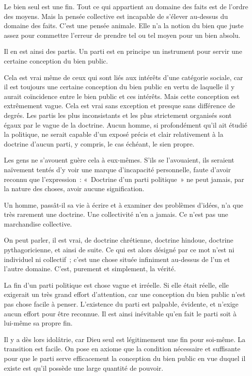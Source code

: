 \documentclass[french,twoside]{book} %
\begin{document}
Le bien seul est une fin. Tout ce qui appartient au domaine des faits est de l’ordre des moyens. Mais la pensée collective est incapable de s’élever au-dessus du domaine des faits. C’est une pensée animale. Elle n’a la notion du bien que juste assez pour commettre l’erreur de prendre tel ou tel moyen pour un bien absolu.\par
Il en est ainsi des partis. Un parti est en principe un instrument pour servir une certaine conception du bien public.\par
Cela est vrai même de ceux qui sont liés aux intérêts d’une catégorie sociale, car il est toujours une certaine conception du bien public en vertu de laquelle il y aurait coïncidence entre le bien public et ces intérêts. Mais cette conception est extrêmement vague. Cela est vrai sans exception et presque sans différence de degrés. Les partis les plus inconsistants et les plus strictement organisés sont égaux par le vague de la doctrine. Aucun homme, si profondément qu’il ait étudié la politique, ne serait capable d’un exposé précis et clair relativement à la doctrine d’aucun parti, y compris, le cas échéant, le sien propre.\par
Les gens ne s’avouent guère cela à eux-mêmes. S’ils se l’avouaient, ils seraient naïvement tentés d’y voir une marque d’incapacité personnelle, faute d’avoir reconnu que l’expression : « Doctrine d’un parti politique » ne peut jamais, par la nature des choses, avoir aucune signification.\par
Un homme, passât-il sa vie à écrire et à examiner des problèmes d’idées, n’a que très rarement une doctrine. Une collectivité n’en a jamais. Ce n’est pas une marchandise collective.\par
On peut parler, il est vrai, de doctrine chrétienne, doctrine hindoue, doctrine pythagoricienne, et ainsi de suite. Ce qui est alors désigné par ce mot n’est ni individuel ni collectif ; c’est une chose située infiniment au-dessus de l’un et l’autre domaine. C’est, purement et simplement, la vérité.\par
La fin d’un parti politique est chose vague et irréelle. Si elle était réelle, elle exigerait un très grand effort d’attention, car une conception du bien public n’est pas chose facile à penser. L’existence du parti est palpable, évidente, et n’exige aucun effort pour être reconnue. Il est ainsi inévitable qu’en fait le parti soit à lui-même sa propre fin.\par
Il y a dès lors idolâtrie, car Dieu seul est légitimement une fin pour soi-même. La transition est facile. On pose en axiome que la condition nécessaire et suffisante pour que le parti serve efficacement la conception du bien public en vue duquel il existe est qu’il possède une large quantité de pouvoir.\par
\end{document}
